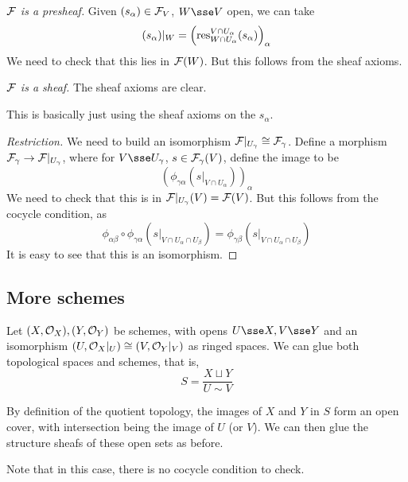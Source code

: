 \documentclass{article}
\begin{document}
\begin{proof}
    [\(\mathcal{F}\) is a presheaf] Given \((s_\alpha) \in \mathcal{F}_V\), \(W \sse V\) open, we can take
    \[(s_\alpha)\vert_W = \left(\operatorname{res}^{V \cap U_\alpha}_{W \cap U_\alpha}(s_\alpha)\right)_\alpha\]
    We need to check that this lies in \(\mathcal{F}(W)\). But this follows from the sheaf axioms.

    \emph{\(\mathcal{F}\) is a sheaf.} The sheaf axioms are clear. \begin{addendum}
        This is basically just using the sheaf axioms on the \(s_\alpha\).
    \end{addendum}

    \emph{Restriction.} We need to build an isomorphism \(\mathcal{F}\vert_{U_{\gamma}} \cong \mathcal{F}_\gamma\). Define a morphism \(\mathcal{F}_\gamma \to \mathcal{F}\vert_{U_\gamma}\), where for \(V \sse U_\gamma\), \(s \in \mathcal{F}_\gamma(V)\), define the image to be
    \[\left(\phi_{\gamma\alpha}(s\vert_{V \cap U_\alpha})\right)_{\alpha}\]
    We need to check that this is in \(\mathcal{F}\vert_{U_\gamma}(V) = \mathcal{F}(V)\). But this follows from the cocycle condition, as
    \[\phi_{\alpha\beta}\circ \phi_{\gamma\alpha}(s\vert_{V \cap U_\alpha \cap U_\beta}) = \phi_{\gamma\beta}(s\vert_{V \cap U_\alpha \cap U_\beta})\]
    It is easy to see that this is an isomorphism.
\end{proof}

\subsection{More schemes}

Let \((X, \mathcal{O}_X), (Y, \mathcal{O}_Y)\) be schemes, with opens \(U \sse X, V \sse Y\) and an isomorphism \((U, \mathcal{O}_X\vert_U) \cong (V, \mathcal{O}_Y\vert_V)\) as ringed spaces. We can glue both topological spaces and schemes, that is,
\[S = \frac{X \sqcup Y}{U \sim V}\]
\lec

By definition of the quotient topology, the images of \(X\) and \(Y\) in \(S\) form an open cover, with intersection being the image of \(U\) (or \(V\)). We can then glue the structure sheafs of these open sets as before.

Note that in this case, there is no cocycle condition to check.
\end{document}
